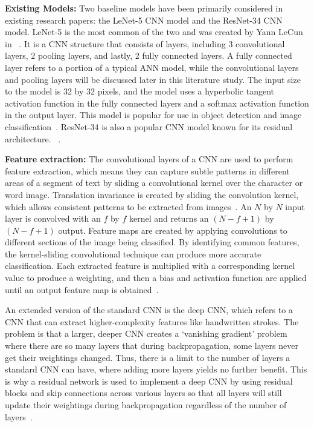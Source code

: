 \textbf{Existing Models:} Two baseline models have been primarily considered in existing research papers: the LeNet-5 CNN model and the ResNet-34 CNN model. LeNet-5 is the most common of the two and was created by Yann LeCun in ~\cite{lecun1998}. It is a CNN structure that consists of  layers, including 3 convolutional layers, 2 pooling layers, and lastly, 2 fully connected layers. A fully connected layer refers to a portion of a typical ANN model, while the convolutional layers and pooling layers will be discussed later in this literature study. The input size to the model is 32 by 32 pixels, and the model uses a hyperbolic tangent activation function in the fully connected layers and a softmax activation function in the output layer. This model is popular for use in object detection and image classification~\cite{chen2023}.
ResNet-34 is also a popular CNN model known for its residual architecture. ~\cite{ma2023}.

\textbf{Feature extraction:} The convolutional layers of a CNN are used to perform feature extraction, which means they can capture subtle patterns in different areas of a segment of text by sliding a convolutional kernel over the character or word image. Translation invariance is created by sliding the convolution kernel, which allows consistent patterns to be extracted from images~\cite{ma2023}. An $N$ by $N$ input layer is convolved with an $f$ by $f$ kernel and returns an $(N-f+1)$ by $(N-f+1)$ output. Feature maps are created by applying convolutions to different sections of the image being classified. By identifying common features, the kernel-sliding convolutional technique can produce more accurate classification. Each extracted feature is multiplied with a corresponding kernel value to produce a weighting, and then a bias and activation function are applied until an output feature map is obtained~\cite{yahya2021}.

An extended version of the standard CNN is the deep CNN, which refers to a CNN that can extract higher-complexity features like handwritten strokes. The problem is that a larger, deeper CNN creates a `vanishing gradient' problem where there are so many layers that during backpropagation, some layers never get their weightings changed. Thus, there is a limit to the number of layers a standard CNN can have, where adding more layers yields no further benefit. This is why a residual network is used to implement a deep CNN by using residual blocks and skip connections across various layers so that all layers will still update their weightings during backpropagation regardless of the number of layers~\cite{ma2023}.

